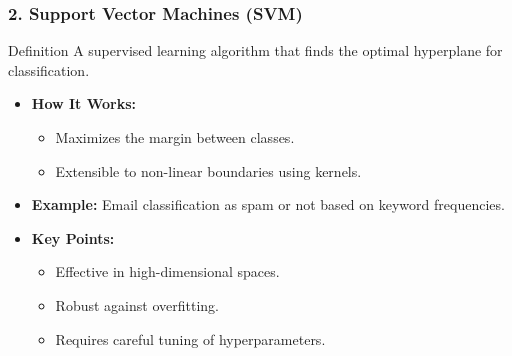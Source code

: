 \documentclass[aspectratio=169]{beamer}
\begin{document}
\begin{frame}[fragile]
    \frametitle{2. Support Vector Machines (SVM)}
    \begin{block}{Definition}
        A supervised learning algorithm that finds the optimal hyperplane for classification.
    \end{block}

    \begin{itemize}
        \item \textbf{How It Works:}
        \begin{itemize}
            \item Maximizes the margin between classes.
            \item Extensible to non-linear boundaries using kernels.
        \end{itemize}
        
        \item \textbf{Example:}
        Email classification as spam or not based on keyword frequencies.

        \item \textbf{Key Points:}
        \begin{itemize}
            \item Effective in high-dimensional spaces.
            \item Robust against overfitting.
            \item Requires careful tuning of hyperparameters.
        \end{itemize}
    \end{itemize}
\end{frame}
\end{document}
